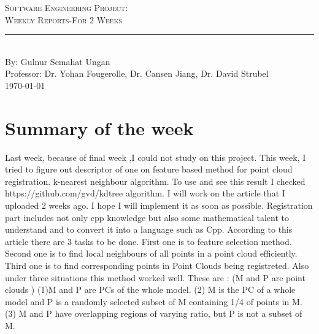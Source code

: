\documentclass[aps,letterpaper,11pt]{revtex4}
\newcommand{\labno}{Software Engineering Project}
\newcommand{\labtitle}{Weekly Reports-For 2 Weeks}
\newcommand{\authorname}{Gulnur Semahat Ungan}
\newcommand{\professor}{Dr. Yohan Fougerolle, Dr. Cansen Jiang, Dr. David Strubel}
\begin{document}
  
\begin{titlepage}
\begin{center}
{\LARGE \textsc{\labno:} \\ \vspace{4pt}}
{\Large \textsc{\labtitle} \\ \vspace{4pt}} 
\rule[13pt]{\textwidth}{1pt} \\ \vspace{150pt}
{\large By: \authorname \\ \vspace{10pt}
Professor: \professor \\ \vspace{10pt}
\today}
\end{center}




\end{titlepage}%
\newpage

\section{Summary of the week}
Last week, because of final week ,I could not study on this project. This week, I tried to figure out descriptor of one on feature based method for point cloud registration. k-nearest neighbour algorithm. To use and see this result I checked https://github.com/gvd/kdtree algorithm. I will work on the article that I uploaded 2 weeks ago. I hope I will implement it as soon as possible. Registration part includes not only cpp knowledge but also some mathematical talent to understand and to convert it into a language such as Cpp. According to this article there are 3 tasks to be done. First one is to feature selection method. Second one is to find local neighbours of all points in a point cloud efficiently. Third one is to find corresponding points in Point Clouds being registreted.  Also under three situations this method worked well. These are : (M and P are  point clouds ) (1)M and P are PCs of the whole model. (2) M is the PC of a whole model and P is a randomly selected subset of M containing 1/4 of points in M. (3) M and P have overlapping regions of varying ratio, but P is not a subset of M.
\end{document}
